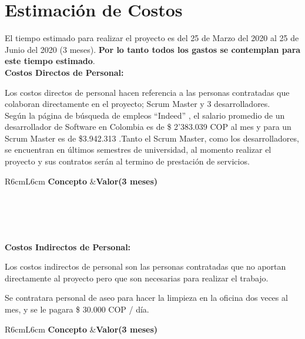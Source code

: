 \documentclass[a4paper,12 pt]{article}
\begin{document}
\section{Estimación de Costos}
El tiempo estimado para realizar el proyecto es del 25 de Marzo del 2020 al 25
de Junio del 2020 (3 meses). \textbf{Por lo tanto todos los gastos se contemplan
para este tiempo estimado}.\\

\textbf{Costos Directos de Personal:}

Los costos directos de personal hacen referencia a las personas contratadas que
colaboran directamente en el proyecto; Scrum Master y 3 desarrolladores.\\

Según la página de búsqueda de empleos “Indeed” \cite{01}, el salario promedio
de un desarrollador de Software en Colombia es de \$ 2’383.039 COP al mes y para
un Scrum Master es de \$3.942.313 .Tanto el Scrum Master, como los
desarrolladores, se encuentran en últimos semestres de universidad, al momento
realizar el proyecto y sus contratos serán al termino de prestación de
servicios. 

\begin{table}[H]
    \centering
    \small{
    \begin{tabular}{R{6cm}L{6cm}}
        \textbf{Concepto}   &\textbf{Valor(3 meses)}\\
        \\
         \\
         \\
        \hline
         \\
    \end{tabular}
    \label{T04}}
\end{table}{}


\textbf{Costos Indirectos de Personal:}


Los costos indirectos de personal son las personas contratadas que no aportan
directamente al proyecto pero que son necesarias para realizar el trabajo.

Se contratara personal de aseo para hacer la limpieza en la oficina dos veces al
mes, y se le pagara \$ 30.000 COP / día.

\begin{table}[H]
    \centering
    \small{
    \begin{tabular}{R{6cm}L{6cm}}
        \textbf{Concepto}   &\textbf{Valor(3 meses)}\\
        \\
         \\
        \hline
         \\
    \end{tabular}
    \label{T201}}
\end{table}{}
\end{document}
